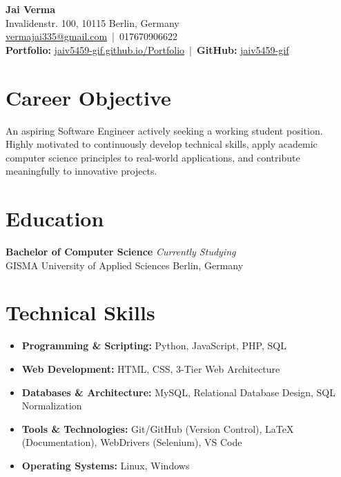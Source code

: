 \documentclass[11pt,a4paper]{article}
\begin{document}
\begin{center}
    {\Huge \textbf{Jai Verma}}\\[0.5em]
    Invalidenstr. 100, 10115 Berlin, Germany \\
    \href{mailto:vermajai335@gmail.com}{vermajai335@gmail.com} \,|\, 
    017670906622 \\[0.5em]
    \textbf{Portfolio:} \href{https://jaiv5459-gif.github.io/Portfolio/}{jaiv5459-gif.github.io/Portfolio} \,|\,
    \textbf{GitHub:} \href{https://github.com/jaiv5459-gif}{jaiv5459-gif}
\end{center}
\vspace{1em}

\section*{Career Objective}
An aspiring Software Engineer actively seeking a working student position. Highly motivated to continuously develop technical skills, apply academic computer science principles to real-world applications, and contribute meaningfully to innovative projects.

\section*{Education}
\noindent
\textbf{Bachelor of Computer Science} \hfill \textit{Currently Studying} \\
GISMA University of Applied Sciences \hfill Berlin, Germany

\section*{Technical Skills}
\begin{itemize}[leftmargin=0.15in, label={--}, itemsep=2pt]
    \item \textbf{Programming \& Scripting:} Python, JavaScript, PHP, SQL
    \item \textbf{Web Development:} HTML, CSS, 3-Tier Web Architecture
    \item \textbf{Databases \& Architecture:} MySQL, Relational Database Design, SQL Normalization
    \item \textbf{Tools \& Technologies:} Git/GitHub (Version Control), LaTeX (Documentation), WebDrivers (Selenium), VS Code
    \item \textbf{Operating Systems:} Linux, Windows
\end{itemize}
\end{document}
